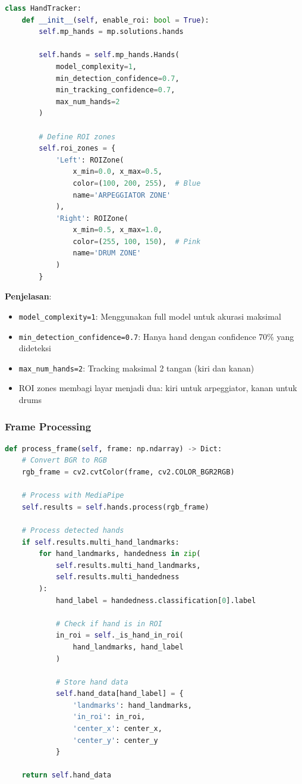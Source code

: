 \begin{lstlisting}[language=Python, caption=Setup MediaPipe Hands]
class HandTracker:
    def __init__(self, enable_roi: bool = True):
        self.mp_hands = mp.solutions.hands
        
        self.hands = self.mp_hands.Hands(
            model_complexity=1,
            min_detection_confidence=0.7,
            min_tracking_confidence=0.7,
            max_num_hands=2
        )
        
        # Define ROI zones
        self.roi_zones = {
            'Left': ROIZone(
                x_min=0.0, x_max=0.5,
                color=(100, 200, 255),  # Blue
                name='ARPEGGIATOR ZONE'
            ),
            'Right': ROIZone(
                x_min=0.5, x_max=1.0,
                color=(255, 100, 150),  # Pink
                name='DRUM ZONE'
            )
        }
\end{lstlisting}

\textbf{Penjelasan}:
\begin{itemize}
    \item \texttt{model\_complexity=1}: Menggunakan full model untuk akurasi maksimal
    \item \texttt{min\_detection\_confidence=0.7}: Hanya hand dengan confidence 70\% yang dideteksi
    \item \texttt{max\_num\_hands=2}: Tracking maksimal 2 tangan (kiri dan kanan)
    \item ROI zones membagi layar menjadi dua: kiri untuk arpeggiator, kanan untuk drums
\end{itemize}

\subsubsection{Frame Processing}

\begin{lstlisting}[language=Python, caption=Memproses setiap frame untuk deteksi tangan]
def process_frame(self, frame: np.ndarray) -> Dict:
    # Convert BGR to RGB
    rgb_frame = cv2.cvtColor(frame, cv2.COLOR_BGR2RGB)
    
    # Process with MediaPipe
    self.results = self.hands.process(rgb_frame)
    
    # Process detected hands
    if self.results.multi_hand_landmarks:
        for hand_landmarks, handedness in zip(
            self.results.multi_hand_landmarks,
            self.results.multi_handedness
        ):
            hand_label = handedness.classification[0].label
            
            # Check if hand is in ROI
            in_roi = self._is_hand_in_roi(
                hand_landmarks, hand_label
            )
            
            # Store hand data
            self.hand_data[hand_label] = {
                'landmarks': hand_landmarks,
                'in_roi': in_roi,
                'center_x': center_x,
                'center_y': center_y
            }
    
    return self.hand_data
\end{lstlisting}

